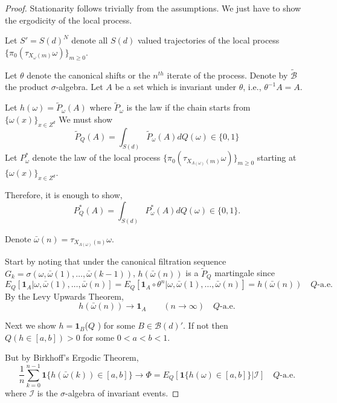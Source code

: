 \documentclass[final]{aomart}
\def\mathscr#1{#1}%
\def\mathbb#1{#1}%
\theoremstyle{plain}
\theoremstyle{definition}
\theoremstyle{remark}
\begin{document}
\begin{proof}
Stationarity follows trivially from the assumptions. We just have to show the ergodicity of the local process. 

Let $\mathscr{S}'= S(d)^{\mathbb{N}}$ denote all $S(d)$ valued trajectories of the local process $\{\pi_0(\tau_{X_{\omega}(m)}\omega)\}_{m \geq 0}$.

Let $\theta$ denote the canonical shifts or the $n^{th}$ iterate of the process. Denote by $\tilde{\mathcal{B}}$ the product $\sigma$-algebra. Let $A$ be a set which is invariant under $\theta$, i.e., $\theta^{-1} A = A$. 
 
Let $h(\omega) =\tilde{P}_{\omega}(A) $ where $\tilde{P}_\omega$ is the law if the chain starts from \\$\{\omega(x)\}_{x \in \mathbb{Z}^d}$
We must show 
\[
\tilde{P}_{\mathbb{Q}} (A) = \int_{\mathscr{S}(d)} \tilde{P}_{\omega}(A) d\mathbb{Q}(\omega) \in \{0,1\}
\]
Let $P^*_{\omega}$ denote the law of the local process $\{\pi_0(\tau_{X_{\Lambda(\omega)}(m)}\omega)\}_{m \geq 0}$ starting at $\{\omega(x)\}_{x \in \mathbb{Z}^d}$. 

Therefore, it is enough to show, \[
{P}^*_{\mathbb{Q}} (A) = \int_{\mathscr{S}(d)}P^*_{\omega}(A) d\mathbb{Q}(\omega) \in  \{0, 1\}.
\]

Denote $\bar{\omega}(n) = \tau_{X_{\Lambda(\omega)}(n)} \omega$. 

Start by noting that under the canonical filtration sequence $\mathscr{G}_{k}= \sigma(\omega, \bar{\omega}(1),\dots,\bar{\omega}(k-1))$,  
$h(\bar{\omega}(n))$ is a $\tilde{P}_{\mathbb{Q}}$ martingale since 
\[
\mathbb{E}_{\mathbb{Q}} [ \boldsymbol{1}_{A}| \omega, \bar{\omega}(1),\dots, \bar{\omega}({n}) ] = \mathbb{E}_{\mathbb{Q}} [ \boldsymbol{1}_{A}\circ \theta^n | \omega, \bar{\omega}(1),\dots, \bar{\omega}({n}) ] = h(\bar{\omega}(n)) \quad \mathbb{Q}\text{-a.e.}
\]
By the Levy Upwards Theorem,
\begin{equation}\label{eq:marty}
h(\bar{\omega}(n)) \to \boldsymbol{1}_A \qquad (n \to \infty) \quad\mathbb{Q}\text{-a.e.}
\end{equation}

Next we show $h = \boldsymbol{1}_B$($\mathbb{Q}$ ) for some $B \in \mathcal{B}(d)'$. If not then \\$\mathbb{Q}( h \in [a,b])>0$ for some $0<a<b<1$. 

But by Birkhoff's Ergodic Theorem, 
\[
\frac{1}{n} \sum_{k=0}^{n-1} \boldsymbol{1}\{h(\bar{\omega}(k))\in [a,b]\} \to \Phi= \mathbb{E}_{\mathbb{Q}}[ \boldsymbol{1}\{h(\omega)\in [a,b]\} | \mathcal{I} ]\quad\mathbb{Q}\text{-a.e.}
\]
where $\mathcal{I}$ is the $\sigma$-algebra of invariant events. 


\end{proof}
\end{document}
